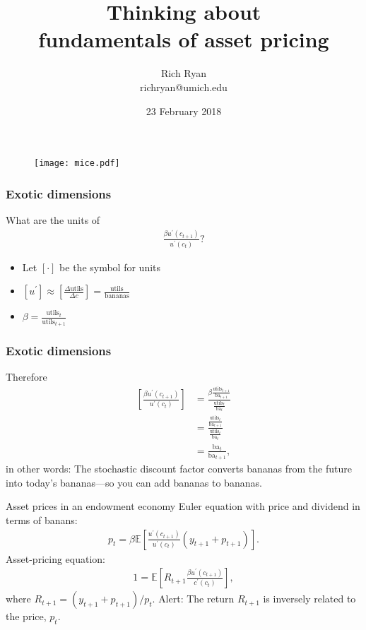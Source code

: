 \documentclass[presentation]{beamer}
\author{Rich Ryan \\ richryan@umich.edu}
\date{23 February 2018}
\title{Thinking about \\ fundamentals of asset pricing}
\begin{document}
\maketitle

\begin{frame}
\begin{figure}[htbp]
\centerline{\texttt{[image: mice.pdf]}}
\end{figure}
\end{frame}

\begin{frame}
\frametitle{Exotic dimensions}

What are the units of
\begin{align*}
\frac{\beta u^{\prime}(c_{t+1})}{u^{\prime}(c_{t})}?
\end{align*}
\begin{itemize}
\item Let $\left[ \cdot \right]$ be the symbol for units
\item $\left[ u^{\prime} \right] \approx \left[ \frac{\Delta \text{utils}}{\Delta c} \right] = \frac{\text{utils}}{\text{bananas}}$
\item $\beta = \frac{\text{utils}_{t}}{\text{utils}_{t+1}}$
\end{itemize}
\end{frame}

\begin{frame}
\frametitle{Exotic dimensions}
Therefore
\begin{align*}
\left[ \frac{\beta u^{\prime}(c_{t+1})}{u^{\prime}(c_{t})} \right] &= \frac{\beta \frac{\text{utils}_{t+1}}{\text{ba}_{t+1}}}{\frac{\text{utils}_{t}}{\text{ba$_{t}$}}} \\
&= \frac{\frac{\text{utils}_{t}}{\text{ba}_{t+1}}}{\frac{\text{utils}_{t}}{\text{ba$_{t}$}}} \\
&= \frac{\text{ba$_{t}$}}{\text{ba}_{t+1}},
\end{align*}
in other words: The stochastic discount factor converts bananas from the future into today's bananas---so you can add bananas to bananas.
\end{frame}


\begin{frame}[label=sec-4-2]{Asset prices in an endowment economy}
Euler equation with price and dividend in terms of banans:
\begin{align*}
p_{t} = \beta \mathbb{E} \left[ \frac{u^{\prime}(c_{t+1})}{u^{\prime}(c_{t})} (y_{t+1}+p_{t+1}) \right].
\end{align*}
Asset-pricing equation:
\begin{align*}
1 = \mathbb{E} \left[ R_{t+1} \frac{\beta u^{\prime}(c_{t+1})}{c^{\prime}(c_{t})} \right],
\end{align*}
where $R_{t+1} = (y_{t+1} + p_{t+1})/p_{t}$.
\alert{Alert}: The return $R_{t+1}$ is inversely related to the price, $p_{t}$.
\end{frame}
\end{document}

